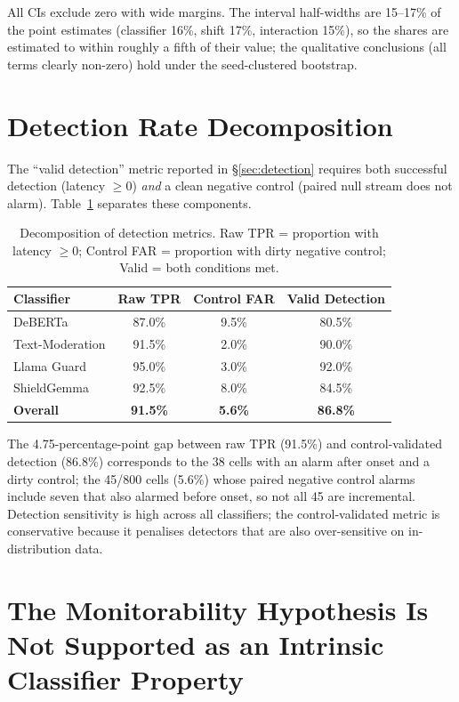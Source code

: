 \documentclass{article}
\begin{document}
All CIs exclude zero with wide margins. The interval half-widths are 15--17\% of the point estimates (classifier 16\%, shift 17\%, interaction 15\%), so the shares are estimated to within roughly a fifth of their value; the qualitative conclusions (all terms clearly non-zero) hold under the seed-clustered bootstrap.

\section{Detection Rate Decomposition}
\label{app:tpr-far}

The ``valid detection'' metric reported in \S\ref{sec:detection} requires both successful detection (latency $\geq 0$) \emph{and} a clean negative control (paired null stream does not alarm). Table~\ref{tab:tpr-far} separates these components.

\begin{table}[h]
\caption{Decomposition of detection metrics. Raw TPR = proportion with latency $\geq 0$; Control FAR = proportion with dirty negative control; Valid = both conditions met.}
\label{tab:tpr-far}
\centering
\small
\begin{tabular}{lccc}
\toprule
\textbf{Classifier} & \textbf{Raw TPR} & \textbf{Control FAR} & \textbf{Valid Detection} \\
\midrule
DeBERTa & 87.0\% & 9.5\% & 80.5\% \\
Text-Moderation & 91.5\% & 2.0\% & 90.0\% \\
Llama Guard & 95.0\% & 3.0\% & 92.0\% \\
ShieldGemma & 92.5\% & 8.0\% & 84.5\% \\
\midrule
\textbf{Overall} & \textbf{91.5\%} & \textbf{5.6\%} & \textbf{86.8\%} \\
\bottomrule
\end{tabular}
\end{table}

The 4.75-percentage-point gap between raw TPR (91.5\%) and control-validated detection (86.8\%) corresponds to the 38 cells with an alarm after onset and a dirty control; the 45/800 cells (5.6\%) whose paired negative control alarms include seven that also alarmed before onset, so not all 45 are incremental. Detection sensitivity is high across all classifiers; the control-validated metric is conservative because it penalises detectors that are also over-sensitive on in-distribution data.

\section{The Monitorability Hypothesis Is Not Supported as an Intrinsic Classifier Property}
\label{app:monitorability}
\end{document}
